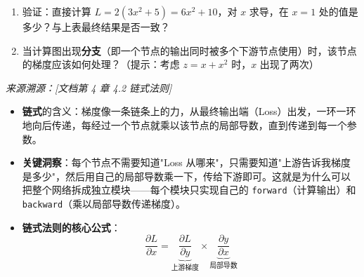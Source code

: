 \documentclass[a4paper,11pt]{ctexart}
\begin{document}
\begin{problembox}
\begin{enumerate}[(1)]
        \item 验证：直接计算 $L = 2(3x^2+5) = 6x^2+10$，对 $x$ 求导，在 $x=1$ 处的值是多少？与上表最终结果是否一致？

        \item 当计算图出现\textbf{分支}（即一个节点的输出同时被多个下游节点使用）时，该节点的梯度应该如何处理？（提示：考虑 $z = x + x^2$ 时，$x$ 出现了两次）
    \end{enumerate}

    \vspace{0.2cm}
    {\color{gray}\small\textit{来源溯源：[文档第 4 章 4.2 链式法则]}}
\end{problembox}

\begin{beginnerbox}
    \begin{itemize}
        \item \textbf{链式}的含义：梯度像一条链条上的力，从最终输出端（Loss）出发，一环一环地向后传递，每经过一个节点就乘以该节点的局部导数，直到传递到每一个参数。
        \item \textbf{关键洞察}：每个节点不需要知道"Loss 从哪来"，只需要知道"上游告诉我梯度是多少"，然后用自己的局部导数乘一下，传给下游即可。这就是为什么可以把整个网络拆成独立模块——每个模块只实现自己的 \texttt{forward}（计算输出）和 \texttt{backward}（乘以局部导数传递梯度）。
        \item \textbf{链式法则的核心公式}：
        \[
        \frac{\partial L}{\partial x} = \underbrace{\frac{\partial L}{\partial y}}_{\text{上游梯度}} \times \underbrace{\frac{\partial y}{\partial x}}_{\text{局部导数}}
        \]
    \end{itemize}
\end{beginnerbox}
\end{document}
